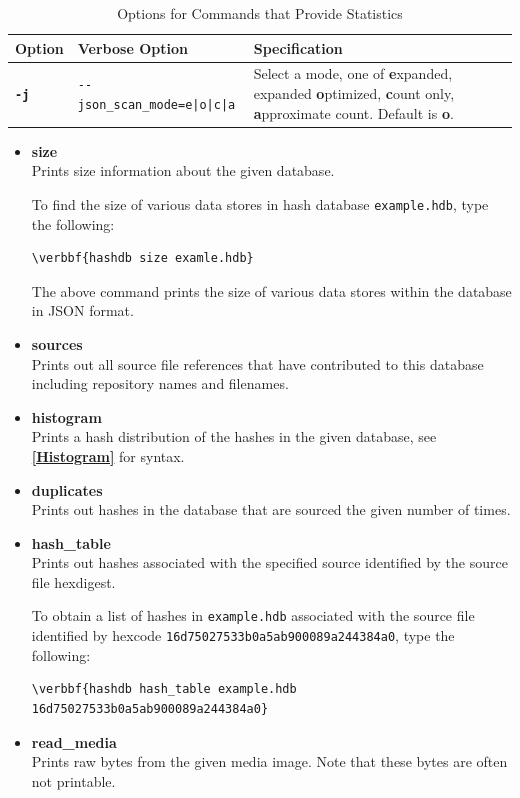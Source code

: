 \documentclass[11pt,fleqn]{article} %
\begin{document}
\begin{table}[!ht]
\centering
\caption{Options for Commands that Provide Statistics}
\label{tab:StatisticsOptions}
\begin{tabular}{|p{1.5 cm}|p{8 cm}|p{4 cm}|}
\hline \hline
\textbf{Option} & \textbf{Verbose Option} & \textbf{Specification} \\
\hline
\textbf{\texttt{-j}} & \verb+--json_scan_mode=e|o|c|a+ & Select a mode, one of \textbf{e}xpanded, expanded \textbf{o}ptimized, \textbf{c}ount only, \textbf{a}pproximate count. Default is \textbf{o}.\\
\hline
\end{tabular}
\end{table}

\begin{itemize}
\item \textbf{size}\\
Prints size information about the given database.

To find the size of various data stores in hash database \texttt{example.hdb},
type the following:
\begin{Verbatim}[commandchars=\\\{\}]
\verbbf{hashdb size examle.hdb}
\end{Verbatim}
The above command prints the size of various data stores within the database in JSON format.\\

\item \textbf{sources}\\
Prints out all source file references that have contributed to this database including repository names and filenames.
\item \textbf{histogram}\\
Prints a hash distribution of the hashes in the given database, see \textbf{\autoref{Histogram}} for syntax.
\item \textbf{duplicates}\\
Prints out hashes in the database that are sourced the given number of times.
\item \textbf{hash\_table}\\
Prints out hashes associated with the specified source identified by the source file hexdigest.

To obtain a list of hashes in \texttt{example.hdb} associated with the source file identified by hexcode \texttt{16d75027533b0a5ab900089a244384a0}, type the following:
\begin{Verbatim}[commandchars=\\\{\}]
\verbbf{hashdb hash_table example.hdb 16d75027533b0a5ab900089a244384a0}
\end{Verbatim}

\item \textbf{read\_media}\\
Prints raw bytes from the given media image. Note that these bytes are often not printable.
\end{itemize}
\end{document}
